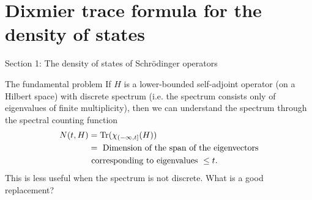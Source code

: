 \documentclass{beamer}
\numberwithin{equation}{section}
\theoremstyle{plain}
\theoremstyle{plain}
\theoremstyle{definition}
\theoremstyle{plain}
\theoremstyle{plain}
\theoremstyle{definition}
\newcommand{\tr}{{\rm Tr}}
\newcommand{\Vol}{\mathrm{Vol}}
\newcommand{\Rl}{\mathbb{R}}
\begin{document}
\section{Dixmier trace formula for the density of states}

\begin{frame}
    \huge{Section 1: The density of states of Schr\"odinger operators}
\end{frame}
% 
\begin{frame}{The fundamental problem}
    If $H$ is a lower-bounded self-adjoint operator (on a Hilbert space) with discrete spectrum (i.e. the spectrum consists only of eigenvalues of finite multiplicity), then we can understand the spectrum through the spectral counting function
    \begin{align*}
        N(t,H) &= \tr(\chi_{(-\infty,t]}(H))\\
                     &= \text{ Dimension of the span of the eigenvectors}\\
                     &\text{ corresponding to eigenvalues }\leq t.
    \end{align*}
    \pause
    This is less useful when the spectrum is not discrete. What is a good replacement?


\end{frame} 
% 
\end{document}
